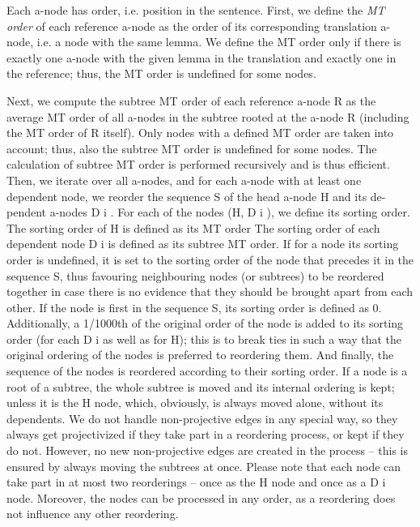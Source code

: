 \documentclass[11pt]{article}
\begin{document}
Each a-node has order, i.e. position in the sentence. %
First, we define the \textit{MT order} of each reference a-node as the order of its
corresponding translation a-node, i.e. a node with the same lemma. We define
the MT order only if there is exactly one a-node with the given lemma in the
translation and exactly one in the reference; thus, the MT order is undefined
for some nodes.

Next, we compute the subtree MT order of each reference a-node R as the
average MT order of all a-nodes in the subtree rooted at the a-node R (including
the MT order of R itself). Only nodes with a defined MT order are taken into
account; thus, also the subtree MT order is undefined for some nodes. The
calculation of subtree MT order is performed recursively and is thus efficient.
Then, we iterate over all a-nodes, and for each a-node with at least one
dependent node, we reorder the sequence S of the head a-node H and its de-
pendent a-nodes D i . For each of the nodes (H, D i ), we define its sorting order.
The sorting order of H is defined as its MT order The sorting order of each
dependent node D i is defined as its subtree MT order.
If for a node its sorting order is undefined, it is set to the sorting order of
the node that precedes it in the sequence S, thus favouring neighbouring nodes
(or subtrees) to be reordered together in case there is no evidence that they
should be brought apart from each other. If the node is first in the sequence S,
its sorting order is defined as 0.
Additionally, a 1/1000th of the original order of the node is added to its
sorting order (for each D i as well as for H); this is to break ties in such a way
that the original ordering of the nodes is preferred to reordering them.
And finally, the sequence of the nodes is reordered according to their sorting
order. If a node is a root of a subtree, the whole subtree is moved and its
internal ordering is kept; unless it is the H node, which, obviously, is always
moved alone, without its dependents.
We do not handle non-projective edges in any special way, so they always
get projectivized if they take part in a reordering process, or kept if they do
not. However, no new non-projective edges are created in the process – this is
ensured by always moving the subtrees at once.
Please note that each node can take part in at most two reorderings – once
as the H node and once as a D i node. Moreover, the nodes can be processed in
any order, as a reordering does not influence any other reordering.
\end{document}
